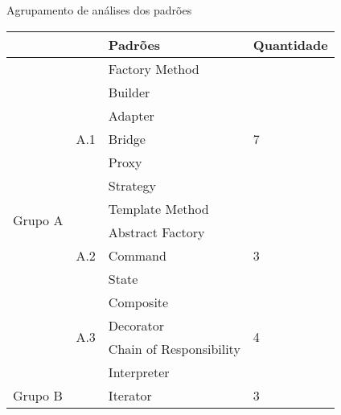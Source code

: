 \begin{quadro}[htb]
    \caption{\label{resultados}Agrupamento de análises dos padrões}
    \begin{tabular}{@{}llll@{}}
        \toprule
                                  &                            & Padrões                 & Quantidade         \\ \midrule
        \multirow{14}{*}{Grupo A} & \multirow{7}{*}{A.1} & Factory Method          & \multirow{7}{*}{7} \\
                                  &                            & Builder                 &                    \\
                                  &                            & Adapter                 &                    \\
                                  &                            & Bridge                  &                    \\
                                  &                            & Proxy                   &                    \\
                                  &                            & Strategy                &                    \\
                                  &                            & Template Method         &                    \\ \cmidrule(r){2-4}
                                  & \multirow{3}{*}{A.2} & Abstract Factory        & \multirow{3}{*}{3} \\
                                  &                            & Command                 &                    \\
                                  &                            & State                   &                    \\ \cmidrule(r){2-4}
                                  & \multirow{4}{*}{A.3} & Composite               & \multirow{4}{*}{4} \\
                                  &                            & Decorator               &                    \\
                                  &                            & Chain of Responsibility &                    \\
                                  &                            & Interpreter             &                    \\ \cmidrule(r){1-4}
        \multicolumn{2}{l}{\multirow{3}{*}{Grupo B}}           & Iterator                & \multirow{3}{*}{3} \\

\end{tabular}
\end{quadro}
